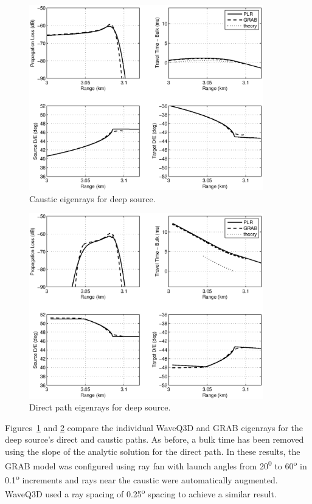 \documentclass{ws-jca}
\begin{document}
\begin{figure}[th]
	\centerline{\includegraphics[width=4in]{pedersen_deep_compare1.eps}} 
	\vspace*{8pt}
	\caption{Caustic eigenrays for deep source. 
	\label{fig:pedersen_deep_compare1}}
\end{figure}
\begin{figure}[th]
	\centerline{\includegraphics[width=4in]{pedersen_deep_compare2.eps}} 
	\vspace*{8pt}
	\caption{Direct path eigenrays for deep source. 
	\label{fig:pedersen_deep_compare2}}
\end{figure}

Figures~\ref{fig:pedersen_deep_compare1} and
\ref{fig:pedersen_deep_compare2} compare the individual WaveQ3D and GRAB
eigenrays for the deep source's direct and caustic paths. As before, a bulk
time has been removed using the slope of the analytic solution for the
direct path. In these results, the GRAB model was configured using ray fan
with launch angles from 20\textsuperscript{0} to 60\textsuperscript{o} in
0.1\textsuperscript{o} increments and rays near the caustic were
automatically augmented. WaveQ3D used a ray spacing of
0.25\textsuperscript{o} spacing to achieve a similar result.
\end{document}
